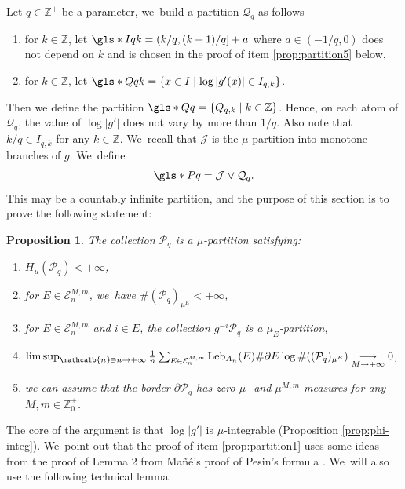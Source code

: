 \documentclass[10pt]{amsart}
\DeclareMathOperator{\Leb}{Leb}
\newcommand{\mcbn}{{\mathcalb{n}}}
\newtheorem{prop}[thm]{Proposition}
\theoremstyle{definition}
\newcommand{\bbZ}{{\mathbb{Z}}}
\begin{document}
Let $q \in \bbZ^+$ be a parameter, we~build a partition $\mathcal{Q}_q$ as follows
\begin{enumerate}
\item
 for $k \in \bbZ$, let $\gls*{Iqk} = (k/q, (k+1)/q] + a$ where $a \in (-1/q, 0)$ does not depend on $k$ and is chosen in the proof of item \eqref{prop:partition5} below,
\item
 for $k \in \bbZ$, let
$\gls*{Qqk} = \{ x \in I \mid \log |g'(x)| \in I_{q,k} \}$.
\end{enumerate}
Then we define the partition
$\gls*{Qq} = \{ Q_{q,k} \mid k \in \bbZ \}$. Hence, on each atom of $\mathcal{Q}_q$, the value of $\log |g'|$ does not vary by more than $1/q$.
Also note that $k/q \in I_{q,k}$ for any $k \in \bbZ$. We~recall that $\mathcal{J}$ is the $\mu$-partition into monotone branches of $g$. We~define
\[
\gls*{Pq} = \mathcal{J} \vee \mathcal{Q}_q.
\]
This may be a countably infinite partition, and the purpose of this section is to prove the following statement:

\begin{prop}
\label{prop:partition}
The collection $\mathcal{P}_q$ is a $\mu$-partition satisfying:
\begin{enumerate}
\item\label{prop:partition1}
 $H_{\mu}(\mathcal{P}_q) < + \infty$,
\item\label{prop:partition2}
 for $E \in \mathcal{E}_n^{M,m}$, we~have $\# (\mathcal{P}_q)_{\mu^E} < + \infty$,
\item\label{prop:partition3}
 for $E \in \mathcal{E}_n^{M,m}$ and $i \in E$, the collection $g^{-i} \mathcal{P}_q$ is a $\mu_E$-partition,
\item\label{prop:partition4}
 $\limsup_{\mcbn \ni n \to +\infty} \frac{1}{n}\sum_{E \in \mathcal{E}_n^{M,m}} \Leb_{A_n}(E) \# \partial E \log \# ((\mathcal{P}_q)_{\mu^E}) \underset{M \to +\infty}{\longrightarrow} 0$,
\item\label{prop:partition5}
 we can assume that the border $\partial \mathcal{P}_q$ has zero $\mu$- and $\mu^{M,m}$-measures for any $M,m \in \bbZ_0^+$.
\end{enumerate}
\end{prop}

The core of the argument is that $\log |g'|$ is $\mu$-integrable (Proposition \ref{prop:phi-integ}). We~point out that the proof of item \eqref{prop:partition1} uses some ideas from the proof of Lemma 2 from Mañé's proof of Pesin's formula \cite{Mane_Pesin}. We~will also use the following technical lemma:
\end{document}
